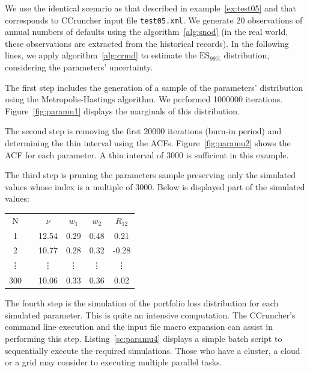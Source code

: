 \documentclass[11pt,fleqn]{book} %
\begin{document}
\begin{example}
	\label{ex:paramu}
	We use the identical scenario as that described in example~\ref{ex:test05} 
	and that corresponds to CCruncher input file \texttt{test05.xml}. We 
	generate 20 observations of annual numbers of defaults using the 
	algorithm~\ref{alg:snod} (in the real world, these observations are extracted
	from the historical records). 
	In the following lines, we apply algorithm~\ref{alg:crmd} to estimate 
	the $\text{ES}_{99\%}$ distribution, considering the parameters' 
	uncertainty. 

	The first step includes the generation of a sample of the parameters' 
	distribution using the Metropolis-Hastings algorithm. We performed 
	\num{1000000} iterations. Figure~\ref{fig:paramu1} displays the 
	marginals of this distribution.
	
	The second step is removing the first \num{20000} iterations (burn-in 
	period) and determining the thin interval using the ACFs. 
	Figure~\ref{fig:paramu2} shows the ACF for each parameter. A thin interval 
	of \num{3000} is sufficient in this example. 
	
	The third step is pruning the parameters sample preserving 
	only the simulated values whose index is a multiple of \num{3000}. 
	Below is displayed part of the simulated values:

	\hspace*{1cm}
	\begin{tabular}{cc|c|c|c|c|}
		\cline{1-1} \cline{3-6}
		\multicolumn{1}{|c|}{N} & & $\nu$ & $w_1$ & $w_2$ & $R_{12}$ \\
		\cline{1-1} \cline{3-6}
		\multicolumn{1}{|c|}{1} & & 12.54 & 0.29 & 0.48 & 0.21 \\
		\cline{1-1} \cline{3-6}
		\multicolumn{1}{|c|}{2} & & 10.77 & 0.28 & 0.32 & -0.28 \\
		\cline{1-1} \cline{3-6}
		\multicolumn{1}{|c|}{\vdots} & & \vdots & \vdots & \vdots & \vdots \\
		\cline{1-1} \cline{3-6}
		\multicolumn{1}{|c|}{300} & & 10.06 & 0.33 & 0.36 & 0.02 \\
		\cline{1-1} \cline{3-6}
	\end{tabular}

	The fourth step is the simulation of the portfolio loss distribution
	for each simulated parameter. This is quite an intensive computation.
	The CCruncher's command line execution and the input file macro expansion
	can assist in performing this step. Listing~\ref{sc:paramu4} displays a 
	simple batch script to sequentially execute the required simulations.
	Those who have a cluster, a cloud or a grid may consider to executing 
	multiple parallel tasks.


\end{example}
\end{document}

